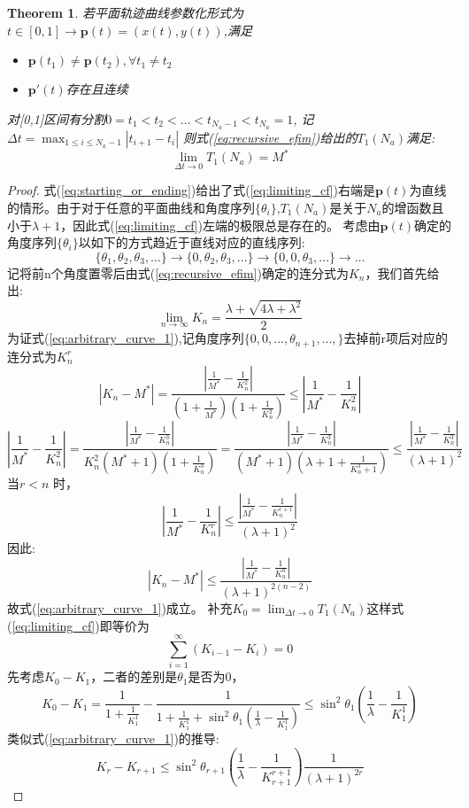 \documentclass[12pt]{article}
\newtheorem{theorem}{Theorem}[section]
\theoremstyle{remark}
\begin{document}
\begin{theorem}\label{theorem:arbitrary_curve}
若平面轨迹曲线参数化形式为$t\in[0,1]\rightarrow \bm{p}(t)=(x(t),y(t))$,满足
\begin{itemize}
\item $\bm{p}(t_1)\neq \bm{p}(t_2),\forall t_1\neq t_2$
\item $\bm{p}'(t)$存在且连续
\end{itemize}
对[0,1]区间有分割$0=t_1<t_2<\dots<t_{N_a-1}<t_{N_a}=1$,
记$\Delta t=\max_{1\leq i\leq N_a-1}|t_{i+1}-t_i|$
则式(\ref{eq:recursive_efim})给出的$T_1(N_a)$满足:
\begin{equation}\label{eq:limiting_cf}
\lim_{\Delta t\to 0}T_1(N_a)=M^*
\end{equation}
\end{theorem}
\begin{proof}
式(\ref{eq:starting_or_ending})给出了式(\ref{eq:limiting_cf})右端是$\bm{p}(t)$为直线的情形。由于对于任意的平面曲线和角度序列$\{\theta_i\}$,$T_1(N_a)$是关于$N_a$的增函数且小于$\lambda+1$，因此式(\ref{eq:limiting_cf})左端的极限总是存在的。
考虑由$\bm{p}(t)$确定的角度序列$\{\theta_i\}$以如下的方式趋近于直线对应的直线序列:
\[
\{\theta_1,\theta_2,\theta_3,\dots\}\rightarrow\{0,\theta_2,\theta_3,\dots\}\rightarrow
\{0,0,\theta_3,\dots\}\rightarrow\dots
\]
记将前n个角度置零后由式(\ref{eq:recursive_efim})确定的连分式为$K_n$，我们首先给出:
\begin{equation}\label{eq:arbitrary_curve_1}
\lim_{n\to\infty}K_n=\frac{\lambda+\sqrt{4\lambda+\lambda^2}}{2}
\end{equation}
为证式(\ref{eq:arbitrary_curve_1}),记角度序列$\{0,0,\dots,\theta_{n+1},\dots,\}$去掉前r项后对应的连分式为$K^r_n$
\[
|K_n-M^*|=\frac{|\frac{1}{M^*}-\frac{1}{K^2_n}|}{(1+\frac{1}{M^*})(1+\frac{1}{K^2_n})}\leq |\frac{1}{M^*}-\frac{1}{K^2_n}|
\]
\[
|\frac{1}{M^*}-\frac{1}{K^2_n}|= \frac{|\frac{1}{M^*}-\frac{1}{K^3_n}|}{K^2_n(M^*+1)(1+\frac{1}{K^3_n})}=
 \frac{|\frac{1}{M^*}-\frac{1}{K^3_n}|}{(M^*+1)(\lambda+1+\frac{1}{K^3_n+1})}\leq \frac{|\frac{1}{M^*}-\frac{1}{K^3_n}|}{(\lambda+1)^2}
\]
当$r<n$ 时，
\[
|\frac{1}{M^*}-\frac{1}{K^r_n}|\leq \frac{|\frac{1}{M^*}-\frac{1}{K^{r+1}_n}|}{(\lambda+1)^2}
\]
因此:
\[
|K_n-M^*|\leq \frac{|\frac{1}{M^*}-\frac{1}{K^{n}_n}|}{(\lambda+1)^{2(n-2)}}
\]
故式(\ref{eq:arbitrary_curve_1})成立。
补充$K_0=\lim_{\Delta t\to 0}T_1(N_a)$这样式(\ref{eq:limiting_cf})即等价为
\begin{equation}\label{eq:equivalent_limiting_cf}
\sum_{i=1}^{\infty}(K_{i-1}-K_{i})=0
\end{equation}
先考虑$K_0-K_1$，二者的差别是$\theta_1$是否为0，
\[
K_0-K_1=\frac{1}{1+\frac{1}{K_1^1}}-\frac{1}{1+\frac{1}{K_1^1}+\sin^2\theta_1(\frac{1}{\lambda}-\frac{1}{K_1^1})}\leq
\sin^2\theta_1(\frac{1}{\lambda}-\frac{1}{K_1^1})
\]
类似式(\ref{eq:arbitrary_curve_1})的推导:
\[
K_r-K_{r+1}\leq \sin^2\theta_{r+1}(\frac{1}{\lambda}-\frac{1}{K_{r+1}^{r+1}})\frac{1}{(\lambda+1)^{2r}}
\]
\end{proof}
\end{document}

